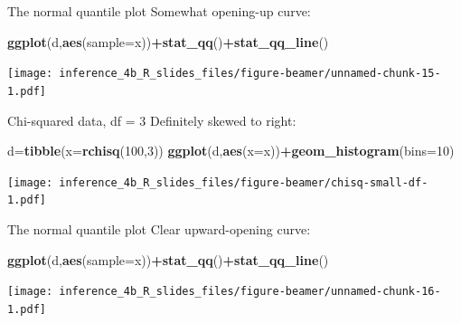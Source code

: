 \documentclass[
  ignorenonframetext,
]{beamer}
\newenvironment{Shaded}{\begin{snugshade}}{\end{snugshade}}
\newcommand{\DataTypeTok}[1]{\textcolor[rgb]{0.13,0.29,0.53}{#1}}
\newcommand{\DecValTok}[1]{\textcolor[rgb]{0.00,0.00,0.81}{#1}}
\newcommand{\KeywordTok}[1]{\textcolor[rgb]{0.13,0.29,0.53}{\textbf{#1}}}
\newcommand{\NormalTok}[1]{#1}
\newcommand{\OperatorTok}[1]{\textcolor[rgb]{0.81,0.36,0.00}{\textbf{#1}}}
\begin{document}
\begin{frame}[fragile]{The normal quantile plot}
\protect\hypertarget{the-normal-quantile-plot-3}{}
Somewhat opening-up curve:

\begin{Shaded}
\begin{Highlighting}[]
\KeywordTok{ggplot}\NormalTok{(d,}\KeywordTok{aes}\NormalTok{(}\DataTypeTok{sample=}\NormalTok{x))}\OperatorTok{+}\KeywordTok{stat\_qq}\NormalTok{()}\OperatorTok{+}\KeywordTok{stat\_qq\_line}\NormalTok{()}
\end{Highlighting}
\end{Shaded}

\texttt{[image: inference\_4b\_R\_slides\_files/figure-beamer/unnamed-chunk-15-1.pdf]}
\end{frame}

\begin{frame}[fragile]{Chi-squared data, df = 3}
\protect\hypertarget{chi-squared-data-df-3}{}
Definitely skewed to right:

\begin{Shaded}
\begin{Highlighting}[]
\NormalTok{d=}\KeywordTok{tibble}\NormalTok{(}\DataTypeTok{x=}\KeywordTok{rchisq}\NormalTok{(}\DecValTok{100}\NormalTok{,}\DecValTok{3}\NormalTok{))}
\KeywordTok{ggplot}\NormalTok{(d,}\KeywordTok{aes}\NormalTok{(}\DataTypeTok{x=}\NormalTok{x))}\OperatorTok{+}\KeywordTok{geom\_histogram}\NormalTok{(}\DataTypeTok{bins=}\DecValTok{10}\NormalTok{)}
\end{Highlighting}
\end{Shaded}

\texttt{[image: inference\_4b\_R\_slides\_files/figure-beamer/chisq-small-df-1.pdf]}
\end{frame}

\begin{frame}[fragile]{The normal quantile plot}
\protect\hypertarget{the-normal-quantile-plot-4}{}
Clear upward-opening curve:

\begin{Shaded}
\begin{Highlighting}[]
\KeywordTok{ggplot}\NormalTok{(d,}\KeywordTok{aes}\NormalTok{(}\DataTypeTok{sample=}\NormalTok{x))}\OperatorTok{+}\KeywordTok{stat\_qq}\NormalTok{()}\OperatorTok{+}\KeywordTok{stat\_qq\_line}\NormalTok{()}
\end{Highlighting}
\end{Shaded}

\texttt{[image: inference\_4b\_R\_slides\_files/figure-beamer/unnamed-chunk-16-1.pdf]}
\end{frame}
\end{document}
